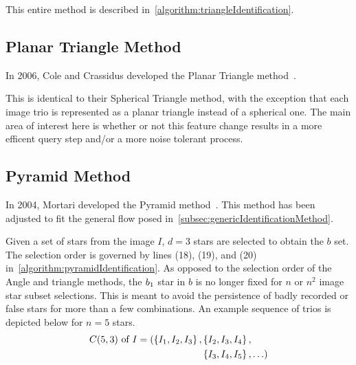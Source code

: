 This entire method is described in~\autoref{algorithm:triangleIdentification}.

\subsection{Planar Triangle Method}\label{subsec:coleAndCrassidus'sPlanarTriangleMethod}
In 2006, Cole and Crassidus developed the Planar Triangle method~\cite{Planar}.

This is identical to their Spherical Triangle method, with the exception that each image trio is represented as a
planar triangle instead of a spherical one.
The main area of interest here is whether or not this feature change results in a more efficent query step and/or
a more noise tolerant process.

\subsection{Pyramid Method}\label{subsec:pyramidMethod}
In 2004, Mortari developed the Pyramid method~\cite{Pyramid}.
This method has been adjusted to fit the general flow posed in~\autoref{subsec:genericIdentificationMethod}.

Given a set of stars from the image $I$, $d = 3$ stars are selected to obtain the $b$ set.
The selection order is governed by lines (18), (19), and (20) in~\autoref{algorithm:pyramidIdentification}.
As opposed to the selection order of the Angle and triangle methods, the $b_1$ star in $b$ is no longer fixed
for $n$ or $n^2$ image star subset selections.
This is meant to avoid the persistence of badly recorded or false stars for more than a few combinations.
An example sequence of trios is depicted below for $n = 5$ stars.
\begin{equation}
    \begin{aligned}
        C(5, 3) \text{ of } I = ( \left\{ I_1, I_2, I_3 \right\}, &\left\{ I_2, I_3, I_4 \right\}, \\
        &\left\{ I_3, I_4, I_5 \right\}, \ldots )
    \end{aligned}
\end{equation}


